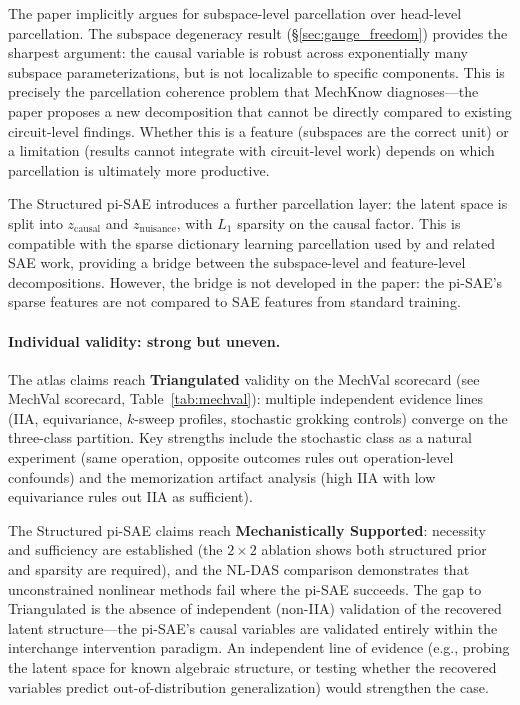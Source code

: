 The paper implicitly argues for subspace-level parcellation over head-level
parcellation. The subspace degeneracy result (\S\ref{sec:gauge_freedom})
provides the sharpest argument: the causal variable is robust across
exponentially many subspace parameterizations, but is not localizable to
specific components. This is precisely the parcellation coherence problem
that MechKnow diagnoses---the paper proposes a new decomposition that cannot
be directly compared to existing circuit-level findings. Whether this is a
feature (subspaces are the correct unit) or a limitation (results cannot
integrate with circuit-level work) depends on which parcellation is
ultimately more productive.

The Structured pi-SAE introduces a further parcellation layer: the latent
space is split into $z_\text{causal}$ and $z_\text{nuisance}$, with $L_1$
sparsity on the causal factor. This is compatible with the sparse dictionary
learning parcellation used by \citet{bricken2023towards} and related SAE
work, providing a bridge between the subspace-level and feature-level
decompositions. However, the bridge is not developed in the paper: the
pi-SAE's sparse features are not compared to SAE features from standard
training.

\paragraph{Individual validity: strong but uneven.}
The atlas claims reach \textbf{Triangulated} validity on the MechVal
scorecard (see MechVal scorecard, Table~\ref{tab:mechval}): multiple independent evidence lines
(IIA, equivariance, $k$-sweep profiles, stochastic grokking controls)
converge on the three-class partition. Key strengths include the stochastic
class as a natural experiment (same operation, opposite outcomes rules out
operation-level confounds) and the memorization artifact analysis (high IIA
with low equivariance rules out IIA as sufficient).

The Structured pi-SAE claims reach \textbf{Mechanistically Supported}:
necessity and sufficiency are established (the $2 \times 2$ ablation shows
both structured prior and sparsity are required), and the NL-DAS comparison
demonstrates that unconstrained nonlinear methods fail where the pi-SAE
succeeds. The gap to Triangulated is the absence of independent (non-IIA)
validation of the recovered latent structure---the pi-SAE's causal variables
are validated entirely within the interchange intervention paradigm. An
independent line of evidence (e.g., probing the latent space for known
algebraic structure, or testing whether the recovered variables predict
out-of-distribution generalization) would strengthen the case.

